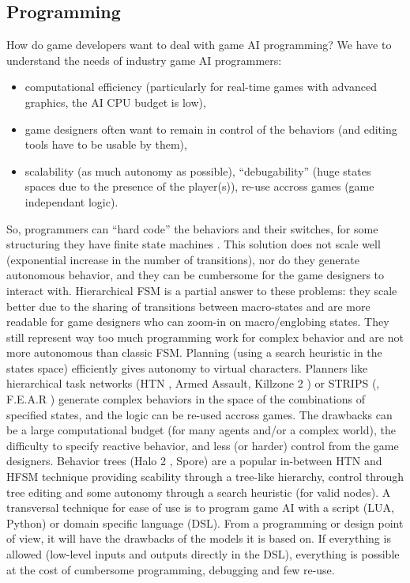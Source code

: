 \subsection{Programming}
How do game developers want to deal with game AI programming? We have to understand the needs of industry game AI programmers: 
\begin{itemize}
    \item computational efficiency (particularly for real-time games with advanced graphics, the AI CPU budget is low),
    \item game designers often want to remain in control of the behaviors (and editing tools have to be usable by them),
    \item scalability (as much autonomy as possible), ``debugability'' (huge states spaces due to the presence of the player(s)), re-use accross games (game independant logic).
\end{itemize}
So, programmers can ``hard code'' the behaviors and their switches, for some structuring they have finite state machines \citep{FSM_AIGameProgWisdom2003}. This solution does not scale well (exponential increase in the number of transitions), nor do they generate autonomous behavior, and they can be cumbersome for the game designers to interact with. Hierarchical FSM \citep{CitationNeeded} is a partial answer to these problems: they scale better due to the sharing of transitions between macro-states and are more readable for game designers who can zoom-in on macro/englobing states. They still represent way too much programming work for complex behavior and are not more autonomous than classic FSM. Planning (using a search heuristic in the states space) efficiently gives autonomy to virtual characters. Planners like hierarchical task networks (HTN \citep{Erol_htnplanning}, Armed Assault, Killzone 2 \citep{ArmA1_HTN,Killzone2_HTN}) or STRIPS (\citep{FikesSTRIPS}, F.E.A.R \citep{orkinGDC_FEAR}) generate complex behaviors in the space of the combinations of specified states, and the logic can be re-used accross games. The drawbacks can be a large computational budget (for many agents and/or a complex world), the difficulty to specify reactive behavior, and less (or harder) control from the game designers. Behavior trees (Halo 2 \citep{Isla}, Spore) are a popular in-between HTN and HFSM technique providing scability through a tree-like hierarchy, control through tree editing and some autonomy through a search heuristic (for valid nodes).
A transversal technique for ease of use is to program game AI with a script (LUA, Python) or domain specific language (DSL). From a programming or design point of view, it will have the drawbacks of the models it is based on. If everything is allowed (low-level inputs and outputs directly in the DSL), everything is possible at the cost of cumbersome programming, debugging and few re-use.

